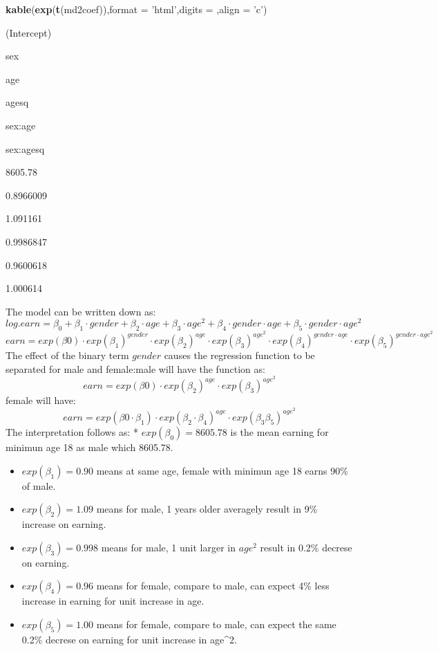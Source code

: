 \documentclass[]{article}
\newenvironment{Shaded}{\begin{snugshade}}{\end{snugshade}}
\newcommand{\DataTypeTok}[1]{\textcolor[rgb]{0.13,0.29,0.53}{#1}}
\newcommand{\KeywordTok}[1]{\textcolor[rgb]{0.13,0.29,0.53}{\textbf{#1}}}
\newcommand{\NormalTok}[1]{#1}
\newcommand{\StringTok}[1]{\textcolor[rgb]{0.31,0.60,0.02}{#1}}
\begin{document}
\begin{Shaded}
\begin{Highlighting}[]
\KeywordTok{kable}\NormalTok{(}\KeywordTok{exp}\NormalTok{(}\KeywordTok{t}\NormalTok{(md2coef)),}\DataTypeTok{format =} \StringTok{'html'}\NormalTok{,}\DataTypeTok{digits =}\NormalTok{ ,}\DataTypeTok{align =} \StringTok{'c'}\NormalTok{)}
\end{Highlighting}
\end{Shaded}

(Intercept)

sex

age

agesq

sex:age

sex:agesq

8605.78

0.8966009

1.091161

0.9986847

0.9600618

1.000614

The model can be written down as:
\[log.earn = \beta_0 + \beta_1 \cdot gender + \beta_2 \cdot age + \beta_3 \cdot age^2 + \beta_4 \cdot gender \cdot age + \beta_5 \cdot gender \cdot age^2\]
\[earn = exp(\beta0) \cdot exp(\beta_1)^{gender} \cdot exp(\beta_2)^{age} \cdot exp(\beta_3)^{age^2} \cdot exp(\beta_4)^{gender \cdot age} \cdot exp(\beta_5)^{gender \cdot age^2}\]
The effect of the binary term \(gender\) causes the regression function
to be separated for male and female:\newline male will have the function
as:
\[earn = exp(\beta0) \cdot exp(\beta_2)^{age} \cdot exp(\beta_3)^{age^2}\]
female will have:
\[earn =  exp(\beta0\cdot\beta_1) \cdot exp(\beta_2\cdot\beta_4)^{age} \cdot exp(\beta_3\beta_5)^{age^2}\]
The interpretation follows as: * \(exp(\beta_0) = 8605.78\) is the mean
earning for minimun age 18 as male which 8605.78.

\begin{itemize}
\item
  \(exp(\beta_1) = 0.90\) means at same age, female with minimun age 18
  earns 90\% of male.
\item
  \(exp(\beta_2) = 1.09\) means for male, 1 years older averagely result
  in 9\% increase on earning.
\item
  \(exp(\beta_3) = 0.998\) means for male, 1 unit larger in \(age^2\)
  result in 0.2\% decrese on earning.
\item
  \(exp(\beta_4) = 0.96\) means for female, compare to male, can expect
  4\% less increase in earning for unit increase in age.
\item
  \(exp(\beta_5) = 1.00\) means for female, compare to male, can expect
  the same 0.2\% decrese on earning for unit increase in age\^{}2.
\end{itemize}
\end{document}
